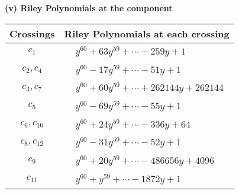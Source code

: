 \documentclass[1p]{elsarticle_modified}
\theoremstyle{definition}
\begin{document}
\newpage\renewcommand{\arraystretch}{1}
\flushleft \textbf{(v) Riley Polynomials at the component}\newline \\
\begin{tabular}{m{50pt}|m{274pt}}
Crossings & \hspace{64pt}Riley Polynomials at each crossing \\
\hline $$\begin{aligned}c_{1}\end{aligned}$$&$\begin{aligned}
&y^{60}+63 y^{59}+\cdots-259 y+1
\end{aligned}$\\
\hline $$\begin{aligned}c_{2},c_{4}\end{aligned}$$&$\begin{aligned}
&y^{60}-17 y^{59}+\cdots-51 y+1
\end{aligned}$\\
\hline $$\begin{aligned}c_{3},c_{7}\end{aligned}$$&$\begin{aligned}
&y^{60}+60 y^{59}+\cdots+262144 y+262144
\end{aligned}$\\
\hline $$\begin{aligned}c_{5}\end{aligned}$$&$\begin{aligned}
&y^{60}-69 y^{59}+\cdots-55 y+1
\end{aligned}$\\
\hline $$\begin{aligned}c_{6},c_{10}\end{aligned}$$&$\begin{aligned}
&y^{60}+24 y^{59}+\cdots-336 y+64
\end{aligned}$\\
\hline $$\begin{aligned}c_{8},c_{12}\end{aligned}$$&$\begin{aligned}
&y^{60}-31 y^{59}+\cdots-52 y+1
\end{aligned}$\\
\hline $$\begin{aligned}c_{9}\end{aligned}$$&$\begin{aligned}
&y^{60}+20 y^{59}+\cdots-486656 y+4096
\end{aligned}$\\
\hline $$\begin{aligned}c_{11}\end{aligned}$$&$\begin{aligned}
&y^{60}+y^{59}+\cdots-1872 y+1
\end{aligned}$\\
\hline
\end{tabular}\\~\\
\end{document}
